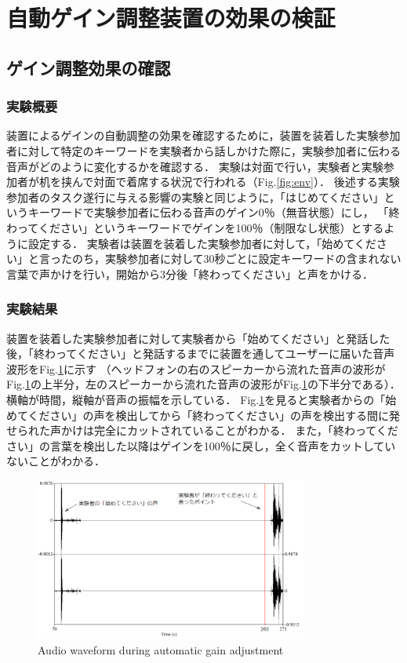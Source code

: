 \documentclass[a4paper]{jarticle}
\begin{document}
\section{自動ゲイン調整装置の効果の検証}
\subsection{ゲイン調整効果の確認}
\subsubsection{実験概要}
装置によるゲインの自動調整の効果を確認するために，装置を装着した実験参加者に対して特定のキーワードを実験者から話しかけた際に，実験参加者に伝わる音声がどのように変化するかを確認する．
実験は対面で行い，実験者と実験参加者が机を挟んで対面で着席する状況で行われる（Fig.\ref{fig:env}）．
後述する実験参加者のタスク遂行に与える影響の実験と同じように，「はじめてください」というキーワードで実験参加者に伝わる音声のゲイン0％（無音状態）にし，
「終わってください」というキーワードでゲインを100％（制限なし状態）とするように設定する．
実験者は装置を装着した実験参加者に対して，「始めてください」と言ったのち，実験参加者に対して30秒ごとに設定キーワードの含まれない言葉で声かけを行い，開始から3分後「終わってください」と声をかける．
\subsubsection{実験結果}
装置を装着した実験参加者に対して実験者から「始めてください」と発話した後，「終わってください」と発話するまでに装置を通してユーザーに届いた音声波形をFig.\ref{fig:voice}に示す
（ヘッドフォンの右のスピーカーから流れた音声の波形がFig.\ref{fig:voice}の上半分，左のスピーカーから流れた音声の波形がFig.\ref{fig:voice}の下半分である）．
横軸が時間，縦軸が音声の振幅を示している．
Fig.\ref{fig:voice}を見ると実験者からの「始めてください」の声を検出してから「終わってください」の声を検出する間に発せられた声かけは完全にカットされていることがわかる．
また，「終わってください」の言葉を検出した以降はゲインを100％に戻し，全く音声をカットしていないことがわかる．
\begin{figure}[htbp]
  \begin{center}
  \includegraphics[width=90mm]{voice.PNG}
  \caption{Audio waveform during automatic gain adjustment}
  \label{fig:voice}
  \end{center}
  \end{figure}
\end{document}
